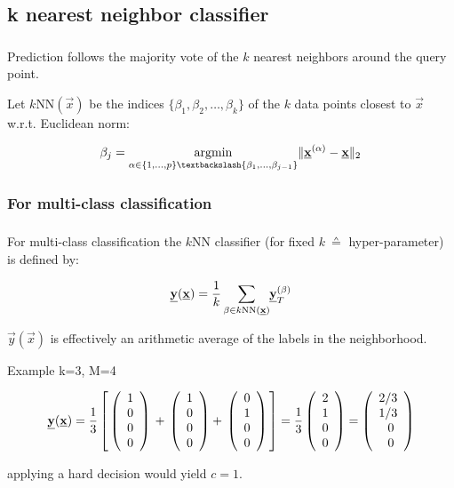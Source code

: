 \subsection{k nearest neighbor classifier}

\begin{frame}\frametitle{\subsecname}
Prediction follows the majority vote of the $k$ nearest neighbors around the query point.

Let $k$NN$(\vec x)$ be the indices $\{\beta_1, \beta_2,\ldots,\beta_k\}$ of the $k$ data points closest to $\vec x$ w.r.t. Euclidean norm:

\begin{equation}
\beta_j = 
\argmin_{\alpha \in \{1,\ldots,p\} \textbackslash \{\beta_{1},\ldots,\beta_{j-1}\}}
\lVert \vec x^{(\alpha)} - \vec x\rVert_{2}
\end{equation}

\end{frame}

\subsubsection{For multi-class classification}

\begin{frame}\frametitle{\subsubsecname}

For multi-class classification the $k$NN classifier (for fixed $k~\corresponds$ hyper-parameter) is defined by:

\begin{equation}
\vec y(\vec x) = \frac{1}{k} \sum_{\beta \in k\mathrm{NN}(\vec x)} \kern-0.5ex \vec y_{T}^{(\beta)}
\label{eq:knn_classifier}
\end{equation}

$\vec y(\vec x)$  is effectively an arithmetic average of the labels in the neighborhood.

\end{frame}

\begin{frame}
Example k=3, M=4

\begin{equation}
\underline{\mathbf{y}}(\underline{\mathbf{x}}) = \frac{1}{3}
\left\lbrack
\,
\left( \begin{array}{rrrrrrrrrrrrrrrrrrrrrrrrrr}  1 \\ 0 \\ 0 \\ 0\\ \end{array} \right)\, +\,
\left( \begin{array}{rrrrrrrrrrrrrrrrrrrrrrrrrr}  1 \\ 0 \\ 0 \\ 0\\ \end{array} \right) +\,
\left( \begin{array}{rrrrrrrrrrrrrrrrrrrrrrrrrr}  0 \\ 1 \\ 0 \\ 0\\ \end{array} \right)\,
\right\rbrack
=
\frac{1}{3}
\left( \begin{array}{rrrrrrrrrrrrrrrrrrrrrrrrrr}  2 \\ 1 \\ 0 \\ 0\\ \end{array} \right)
=
\left( \begin{array}{rrrrrrrrrrrrrrrrrrrrrrrrrr}  2/3 \\ 1/3 \\ 0\; \\ 0\;\\ \end{array} \right)
\end{equation}

applying a hard decision would yield $c=1$.
    
\end{frame}

